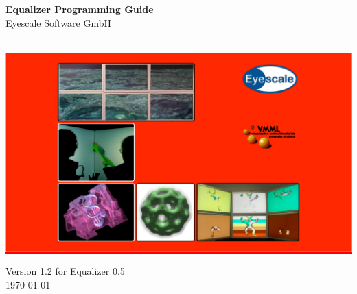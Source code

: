 \documentclass[10pt]{scrartcl}
\newcommand{\boxwidth}{5in}
\newcommand{\spacewidth}{604pt}
\begin{document}
\thispagestyle{empty}

\vfill
\parbox[t]{\spacewidth}{\hfill}
\parbox[t]{\boxwidth}{
  \center
  \textsf{\textbf{\huge Equalizer Programming Guide}}\\[\bigskipamount]
  {\Large Eyescale Software GmbH}
}\\
\vfill
\hspace{-122pt}\colorbox{red}{
  \hspace{604pt}\includegraphics[width=604pt]{images/teaser.pdf}
}\\
\vfill
\parbox[t]{\spacewidth}{\hfill}
\parbox[t]{\boxwidth}{
  \center
  {\Large Version 1.2 for Equalizer 0.5}\\[\bigskipamount]
  {\Large \today}
}
\end{document}
